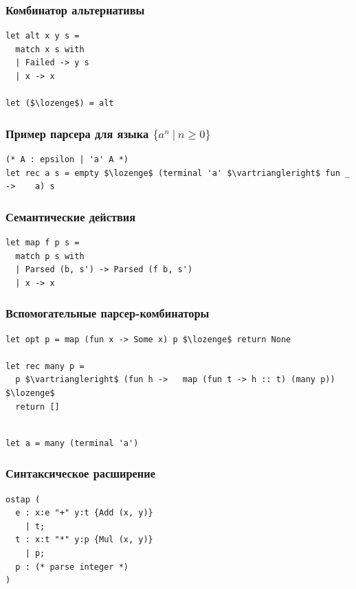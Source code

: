 \documentclass{beamer}
\begin{document}
\begin{frame}[fragile]
  \transwipe[direction=90]
  \frametitle{Комбинатор альтернативы}  
\begin{lstlisting}[frame=single]  
let alt x y s =
  match x s with
  | Failed -> y s
  | x -> x

let ($\lozenge$) = alt
\end{lstlisting}
\end{frame}


\begin{frame}[fragile]
  \transwipe[direction=90]
  \frametitle{Пример парсера для языка $\{ a^n \ | \ n \geq 0 \}$}  
\begin{lstlisting}[frame=single]  
(* A : epsilon | 'a' A *)
let rec a s = empty $\lozenge$ (terminal 'a' $\vartriangleright$ fun _ ->    a) s
\end{lstlisting}
\end{frame}


\begin{frame}[fragile]
  \transwipe[direction=90]
  \frametitle{Семантические действия}  
\begin{lstlisting}[frame=single]  
let map f p s = 
  match p s with
  | Parsed (b, s') -> Parsed (f b, s')
  | x -> x
\end{lstlisting}
\end{frame}

\begin{frame}[fragile]
  \transwipe[direction=90]
  \frametitle{Вспомогательные парсер-комбинаторы}  
\begin{lstlisting}[frame=single]  
let opt p = map (fun x -> Some x) p $\lozenge$ return None
    
let rec many p =
  p $\vartriangleright$ (fun h ->   map (fun t -> h :: t) (many p)) $\lozenge$ 
  return []
    
\end{lstlisting}

\begin{lstlisting}[frame=single]  
let a = many (terminal 'a')
\end{lstlisting}
\end{frame}

\begin{frame}[fragile]
  \transwipe[direction=90]
  \frametitle{Синтаксическое расширение}  
\begin{lstlisting}[frame=single]  
ostap (
  e : x:e "+" y:t {Add (x, y)} 
    | t; 
  t : x:t "*" y:p {Mul (x, y)} 
    | p;
  p : (* parse integer *)
)
\end{lstlisting}
\end{frame}
\end{document}
